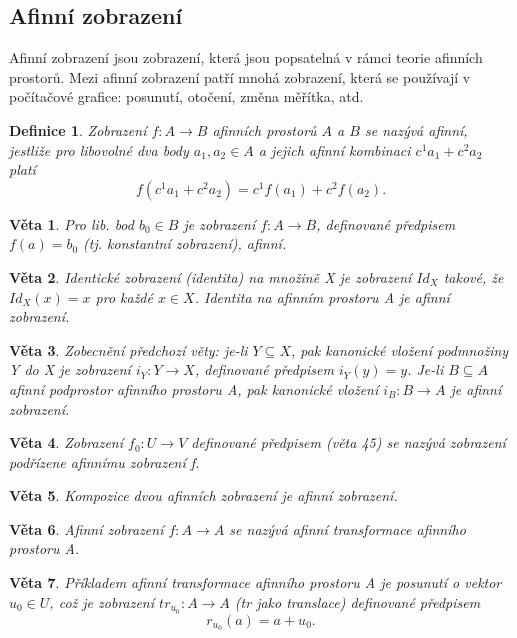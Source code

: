 \documentclass[12pt,a4paper]{article}
\newtheorem{definition}{Definice}
\newtheorem{sentence}{Věta}
\begin{document}
\subsection{Afinní zobrazení}
Afinní zobrazení jsou zobrazení, která jsou popsatelná v rámci teorie afinních prostorů. Mezi afinní zobrazení patří mnohá zobrazení, která se používají v počítačové grafice: posunutí, otočení, změna měřítka, atd.

\begin{definition}
	Zobrazení $f : A \rightarrow B$ afinních prostorů $A$ a $B$ se nazývá afinní, jestliže pro libovolné dva body $a_1,a_2 \in A$ a jejich afinní kombinaci $c^1a_1 + c^2a_2$ platí $$f(c^1a_1 + c^2a_2) = c^1f(a_1) + c^2f(a_2).$$
\end{definition}

\begin{sentence}
	Pro lib. bod $b_0 \in B$ je zobrazení $f : A \rightarrow B$, definované předpisem $f(a) = b_0$ (tj. konstantní zobrazení), afinní.
\end{sentence}

\begin{sentence}
	Identické zobrazení (identita) na množině X je zobrazení $Id_X$ takové, že $Id_X(x) = x$ pro každé $x \in X$. Identita na afinním prostoru A je afinní zobrazení.
\end{sentence}

\begin{sentence}
	Zobecnění předchozí věty: je-li $Y \subseteq X$, pak kanonické vložení podmnožiny Y do X je zobrazení $i_Y : Y \rightarrow X$, definované předpisem $i_Y(y) = y$. Je-li $B \subseteq A$ afinní podprostor afinního prostoru A, pak kanonické vložení $i_B : B \rightarrow A$ je afinní zobrazení.  
\end{sentence}

\begin{sentence}
	Zobrazení $f_0 : U \rightarrow V$ definované předpisem (věta 45) se nazývá zobrazení podřízene afinnímu zobrazení f.
\end{sentence}
\begin{sentence}
	Kompozice dvou afinních zobrazení je afinní zobrazení.
\end{sentence}

\begin{sentence}
	Afinní zobrazení $f : A \rightarrow A$ se nazývá afinní transformace afinního prostoru A.	
\end{sentence}

\begin{sentence}
	Příkladem afinní transformace afinního prostoru A je posunutí o vektor $u_0 \in U$, což je zobrazení $tr_{u_0} : A \rightarrow A$ (tr jako translace) definované předpisem $$r_{u_0}(a) = a + u_0.$$
\end{sentence}
\end{document}
